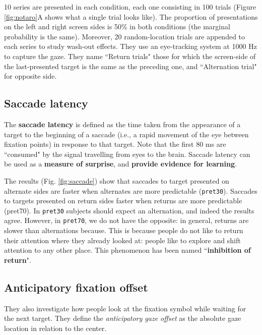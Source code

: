 10 series are presented in each condition, each one consisting in 100 trials (Figure \ref{fig:notaro}A shows what a single trial looks like).
The proportion of presentations on the left and right screen sides is 50\% in both conditions (the marginal probability is the same).
Moreover, 20 random-location trials are appended to each series to study wash-out effects. They use an eye-tracking system at 1000 Hz to capture the gaze.
They name ``Return trials" those for which the screen-side of the last-presented target is the same as the preceding one, and ``Alternation trial" for opposite side.

\subsection{Saccade latency}
The \textbf{saccade latency} is defined as the time taken from the appearance of a target to the beginning of a saccade (i.e., a rapid movement of the eye between fixation points) in response to that target. Note that the first 80 ms are ``consumed" by the signal travelling from eyes to the brain. Saccade latency can be used as a \textbf{measure of surprise}, and \textbf{provide evidence for learning}.

The results (Fig. \ref{fig:saccade}) show that saccades to target presented on alternate sides are faster when alternates are more predictable (\texttt{pret30}). Saccades to targets presented on return sides faster when returns are more predictable (pret70). In \texttt{pret30} subjects should expect an alternation, and indeed the results agree. However, in \texttt{pret70}, we do not have the opposite: in general, returns are slower than alternations because. This is because people do not like to return their attention where they already looked at: people like to explore and shift attention to any other place. This phenomenon has been named ``\textbf{inhibition of return}".

\subsection{Anticipatory fixation offset}
They also investigate how people look at the fixation symbol while waiting for the next target.
They define the \textit{anticipatory gaze offset} as the absolute gaze location in relation to the center.

